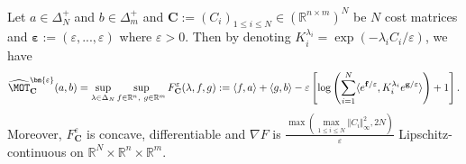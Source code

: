\begin{prop}
\label{prop:algo-dual}
Let $a\in\Delta_N^{+}$ and $b\in\Delta^+_m$ and $\mathbf{C}:=(C_i)_{1\leq i\leq N}\in\left(\mathbb{R}^{n\times m}\right)^N$ be $N$ cost matrices and $\bm{\varepsilon}:=(\varepsilon,...,\varepsilon)$ where $\varepsilon>0$. Then by denoting $K_i^{\lambda_i} =\exp\left(-\lambda_i C_{i}/\varepsilon\right)$, we have
\begin{align*}
\widehat{\MOT}_{\mathbf{C}}^{\bm{\varepsilon}}(a,b)=\sup_{\lambda\in\Delta_N}\sup\limits_{f\in \mathbb{R}^n,~g\in \mathbb{R}^m} F_{\mathbf{C}}^{\varepsilon}(\lambda,f,g):= \langle f, a\rangle+\langle g,b\rangle -\varepsilon\left[\log\left(\sum_{i=1}^N\langle e^{\mathbf{f}/\varepsilon},K_i^{\lambda_i} e^{\mathbf{g}/\varepsilon}\rangle \right) + 1\right].
\end{align*}
Moreover, $F_{\mathbf{C}}^{\varepsilon}$ is concave, differentiable and $\nabla F$ is $\frac{\max\left(\max\limits_{1\leq i\leq N}\Vert C_i\Vert_{\infty}^2,2N\right)}{\varepsilon}$ Lipschitz-continuous on $\mathbb{R}^N\times \mathbb{R}^n \times\mathbb{R}^m$.
\end{prop}


